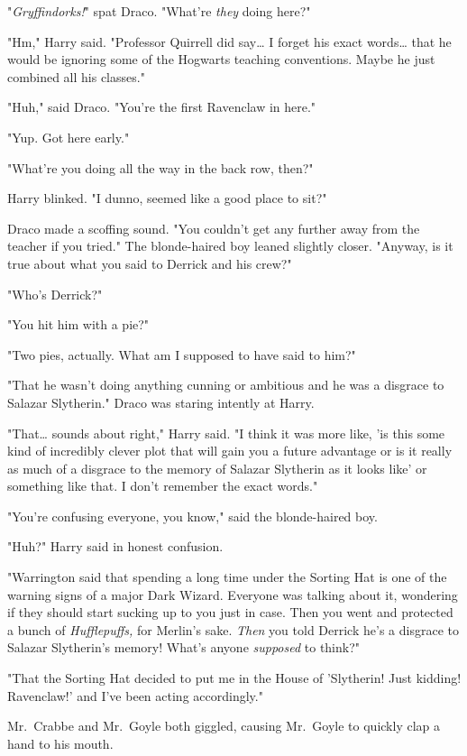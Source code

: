 "\emph{Gryffindorks!}" spat Draco. "What're \emph{they} doing here?"

"Hm," Harry said. "Professor Quirrell did say{\ldots} I forget his exact 
words{\ldots} that he would be ignoring some of the Hogwarts teaching 
conventions. Maybe he just combined all his classes."

"Huh," said Draco. "You're the first Ravenclaw in here."

"Yup. Got here early."

"What're you doing all the way in the back row, then?"

Harry blinked. "I dunno, seemed like a good place to sit?"

Draco made a scoffing sound. "You couldn't get any further away from the 
teacher if you tried." The blonde-haired boy leaned slightly closer. "Anyway, 
is it true about what you said to Derrick and his crew?"

"Who's Derrick?"

"You hit him with a pie?"

"Two pies, actually. What am I supposed to have said to him?"

"That he wasn't doing anything cunning or ambitious and he was a disgrace to 
Salazar Slytherin." Draco was staring intently at Harry.

"That{\ldots} sounds about right," Harry said. "I think it was more like, 'is 
this some kind of incredibly clever plot that will gain you a future advantage 
or is it really as much of a disgrace to the memory of Salazar Slytherin as it 
looks like' or something like that. I don't remember the exact words."

"You're confusing everyone, you know," said the blonde-haired boy.

"Huh?" Harry said in honest confusion.

"Warrington said that spending a long time under the Sorting Hat is one of the 
warning signs of a major Dark Wizard. Everyone was talking about it, wondering 
if they should start sucking up to you just in case. Then you went and 
protected a bunch of \emph{Hufflepuffs,} for Merlin's sake. \emph{Then} you 
told Derrick he's a disgrace to Salazar Slytherin's memory! What's anyone 
\emph{supposed} to think?"

"That the Sorting Hat decided to put me in the House of 'Slytherin! Just 
kidding! Ravenclaw!' and I've been acting accordingly."

Mr.~Crabbe and Mr.~Goyle both giggled, causing Mr.~Goyle to quickly clap a hand 
to his mouth.

